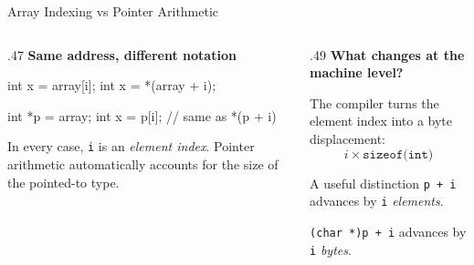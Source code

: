 \documentclass[9pt,aspectratio=169,xcolor=table]{beamer}
\begin{document}
\begin{frame}[fragile]{Array Indexing vs Pointer Arithmetic}
	\begin{columns}[T]
		\begin{column}{.47\textwidth}
			\textbf{Same address, different notation}
			\begin{cc}
	int x = array[i];
	int x = *(array + i);

	int *p = array;
	int x = p[i];   // same as *(p + i)
			\end{cc}

			\vspace{2mm}
			{\small
				In every case, \texttt{i} is an \emph{element index}.
				Pointer arithmetic automatically accounts for the size
				of the pointed-to type.
			}
		\end{column}

		\begin{column}{.49\textwidth}
			\textbf{What changes at the machine level?}

			\vspace{1mm}
			{\small
				The compiler turns the element index into a byte
				displacement:
				\[
				i \times \texttt{sizeof(int)}
				\]
			}

			\vspace{2mm}

			\begin{block}{A useful distinction}
				\small
				\texttt{p + i} advances by \texttt{i} \emph{elements}.

				\vspace{1mm}

				\texttt{(char *)p + i} advances by \texttt{i} \emph{bytes}.
			\end{block}
		\end{column}
	\end{columns}

\end{frame}
\end{document}
